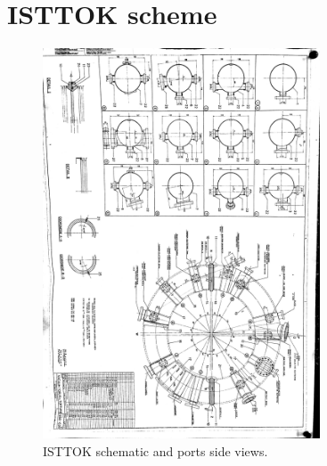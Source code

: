 \chapter{ISTTOK scheme}
\label{ISTTOK_scheme}

\begin{figure}[h]
	\centering
	\includegraphics[width=0.7325\textwidth]{AppCont/isttok_schematic.png}
	\caption{ ISTTOK schematic and ports side views. \label{ISTTOK_schema}}
\end{figure}